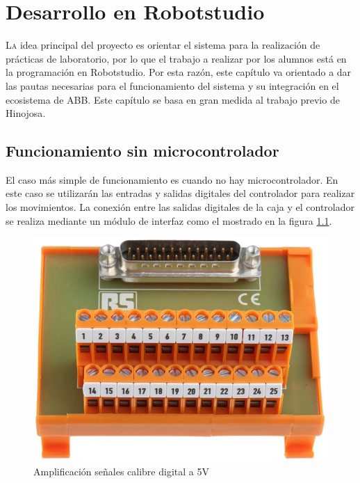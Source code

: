 \chapter{Desarrollo en Robotstudio}\label{chp-06}

\lettrine[lraise=-0.1, lines=2, loversize=0.2]{L}a idea principal del proyecto es orientar el sistema para la realización de prácticas de 
laboratorio, por lo que el trabajo a realizar por los alumnos está en la programación en 
Robotstudio. Por esta razón, este capítulo va orientado a dar las pautas necesarias para el 
funcionamiento del sistema y su integración en el ecosistema de ABB. Este capítulo se basa 
en gran medida al trabajo previo de Hinojosa\cite{rea}.

\section{Funcionamiento sin microcontrolador}

El caso más simple de funcionamiento es cuando no hay microcontrolador. En este caso se
utilizarán las entradas y salidas digitales del controlador para realizar los movimientos.
La conexión entre las salidas digitales de la caja y el controlador se realiza mediante 
un módulo de interfaz como el mostrado en la figura \ref{fig:interfazfisicadigital}.

\begin{figure}[hbtp]
    \centering
    \includegraphics[width=\textwidth/2]{06-robotstudio/interfazdigital.jpg}
    \caption{Amplificación señales calibre digital a 5V}
    \label{fig:interfazfisicadigital}
    \end{figure}

